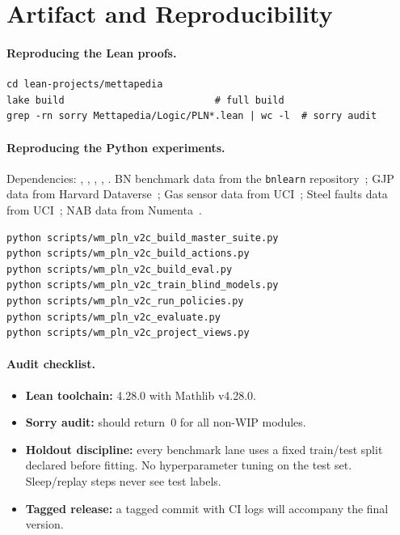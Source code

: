 \documentclass[11pt,openany]{report}
\begin{document}
\section{Artifact and Reproducibility}
\label{sec:artifact}

\paragraph{Reproducing the Lean proofs.}

\begin{lstlisting}
cd lean-projects/mettapedia
lake build                          # full build
grep -rn sorry Mettapedia/Logic/PLN*.lean | wc -l  # sorry audit
\end{lstlisting}

\paragraph{Reproducing the Python experiments.}

Dependencies: , , ,
, .  BN benchmark data from the
\texttt{bnlearn} repository~\cite{ScutariBnRepository};
GJP data from Harvard Dataverse~\cite{IARPA2024GJPData};
Gas sensor data from UCI~\cite{Vergara2012GasSensorDrift};
Steel faults data from UCI~\cite{Buscema2010SteelPlates};
NAB data from Numenta~\cite{Lavin2015NAB}.

\begin{lstlisting}
python scripts/wm_pln_v2c_build_master_suite.py
python scripts/wm_pln_v2c_build_actions.py
python scripts/wm_pln_v2c_build_eval.py
python scripts/wm_pln_v2c_train_blind_models.py
python scripts/wm_pln_v2c_run_policies.py
python scripts/wm_pln_v2c_evaluate.py
python scripts/wm_pln_v2c_project_views.py
\end{lstlisting}

\paragraph{Audit checklist.}
\begin{itemize}
\item \textbf{Lean toolchain:} 4.28.0 with Mathlib v4.28.0.
\item \textbf{Sorry audit:} 
  should return~0 for all non-WIP modules.
\item \textbf{Holdout discipline:} every benchmark lane uses a fixed train/test split
  declared before fitting.  No hyperparameter tuning on the test set.
  Sleep/replay steps never see test labels.
\item \textbf{Tagged release:} a tagged commit with CI logs will accompany the
  final version.
\end{itemize}
\end{document}
